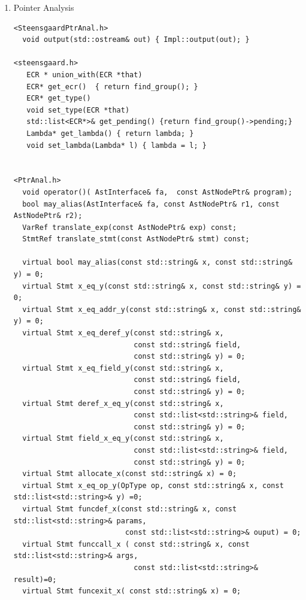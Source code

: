 \begin{enumerate}
\begin{enumerate}
\begin{lstlisting}
<CFG/OARIFG.h>
  unsigned int HighWaterMarkNodeId();  // largest node id in the graph
  int IsValid(RIFGNodeId n);     // is the node id still valid, or has it been freed
  int GetFanin(TarjanIntervals *, RIFGNodeId);
  RIFGNodeId GetRootNode();
  RIFGNodeId GetFirstNode();
  RIFGNodeId GetLastNode();
  RIFGNodeId GetNextNode(RIFGNodeId n);
  RIFGNodeId GetPrevNode(RIFGNodeId n);
  RIFGNodeId GetEdgeSrc(RIFGEdgeId e);
  RIFGNodeId GetEdgeSink(RIFGEdgeId e);
  RIFGNodeId *GetTopologicalMap(TarjanIntervals *);
  RIFGNode *GetRIFGNode(RIFGNodeId n);
  RIFGEdge *GetRIFGEdge(RIFGEdgeId e);
  RIFGEdgeIterator *GetEdgeIterator(RIFG &fg, RIFGNodeId n, RIFG::EdgeDirection ed);
  RIFGNodeIterator *GetNodeIterator(RIFG &fg, RIFG::ForwardBackward fb);

      \end{lstlisting}

      \item Pointer Analysis 
      \begin{lstlisting}
<SteensgaardPtrAnal.h>
  void output(std::ostream& out) { Impl::output(out); }

<steensgaard.h>
   ECR * union_with(ECR *that) 
   ECR* get_ecr()  { return find_group(); }
   ECR* get_type() 
   void set_type(ECR *that) 
   std::list<ECR*>& get_pending() {return find_group()->pending;}
   Lambda* get_lambda() { return lambda; }
   void set_lambda(Lambda* l) { lambda = l; } 


<PtrAnal.h>
  void operator()( AstInterface& fa,  const AstNodePtr& program);
  bool may_alias(AstInterface& fa, const AstNodePtr& r1, const AstNodePtr& r2);
  VarRef translate_exp(const AstNodePtr& exp) const;
  StmtRef translate_stmt(const AstNodePtr& stmt) const;

  virtual bool may_alias(const std::string& x, const std::string& y) = 0;
  virtual Stmt x_eq_y(const std::string& x, const std::string& y) = 0; 
  virtual Stmt x_eq_addr_y(const std::string& x, const std::string& y) = 0; 
  virtual Stmt x_eq_deref_y(const std::string& x, 
                            const std::string& field,
                            const std::string& y) = 0;
  virtual Stmt x_eq_field_y(const std::string& x, 
                            const std::string& field,
                            const std::string& y) = 0;
  virtual Stmt deref_x_eq_y(const std::string& x, 
                            const std::list<std::string>& field,
                            const std::string& y) = 0;
  virtual Stmt field_x_eq_y(const std::string& x, 
                            const std::list<std::string>& field,
                            const std::string& y) = 0;
  virtual Stmt allocate_x(const std::string& x) = 0;
  virtual Stmt x_eq_op_y(OpType op, const std::string& x, const std::list<std::string>& y) =0;
  virtual Stmt funcdef_x(const std::string& x, const std::list<std::string>& params,
                          const std::list<std::string>& ouput) = 0;
  virtual Stmt funccall_x ( const std::string& x, const std::list<std::string>& args,
                            const std::list<std::string>& result)=0; 
  virtual Stmt funcexit_x( const std::string& x) = 0;


\end{lstlisting}
\end{enumerate}
\end{enumerate}
